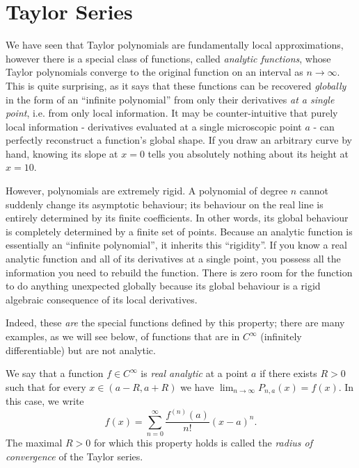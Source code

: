 \documentclass[../analysis1.tex]{subfiles}
\begin{document}
\section{Taylor Series}


We have seen that Taylor polynomials are fundamentally local approximations, however there is a special class of functions, called \textit{analytic functions}, whose Taylor polynomials converge to the original function on an interval as $n\to\infty$. This is quite surprising, as it says that these functions can be recovered \textit{globally} in the form of an ``infinite polynomial'' from only their derivatives \textit{at a single point}, i.e. from only local information. It may be counter-intuitive that purely local information - derivatives evaluated at a single microscopic point $a$ - can perfectly reconstruct a function's global shape. If you draw an arbitrary curve by hand, knowing its slope at $x=0$ tells you absolutely nothing about its height at $x=10$.

However, polynomials are extremely rigid. A polynomial of degree $n$ cannot suddenly change its asymptotic behaviour; its behaviour on the real line is entirely determined by its finite coefficients. In other words, its global behaviour is completely determined by a finite set of points. Because an analytic function is essentially an ``infinite polynomial'', it inherits this ``rigidity''. If you know a real analytic function and all of its derivatives at a single point, you possess all the information you need to rebuild the function. There is zero room for the function to do anything unexpected globally because its global behaviour is a rigid algebraic consequence of its local derivatives.

Indeed, these \textit{are} the special functions defined by this property; there are many examples, as we will see below, of functions that are in $C^{\infty}$ (infinitely differentiable) but are not analytic.

\begin{definition}
    \begin{shaded*}
        We say that a function $f\in C^{\infty}$ is \textit{real analytic} at a point $a$ if there exists $R>0$ such that for every $x\in (a-R,a+R)$ we have $\lim_{n\to\infty}P_{n,a}(x)=f(x)$. In this case, we write
        \[f(x)=\sum_{n=0}^{\infty}\frac{f^{(n)}(a)}{n!}(x-a)^n.\]
        The maximal $R>0$ for which this property holds is called the \textit{radius of convergence} of the Taylor series.
    \end{shaded*}
\end{definition}
\end{document}
